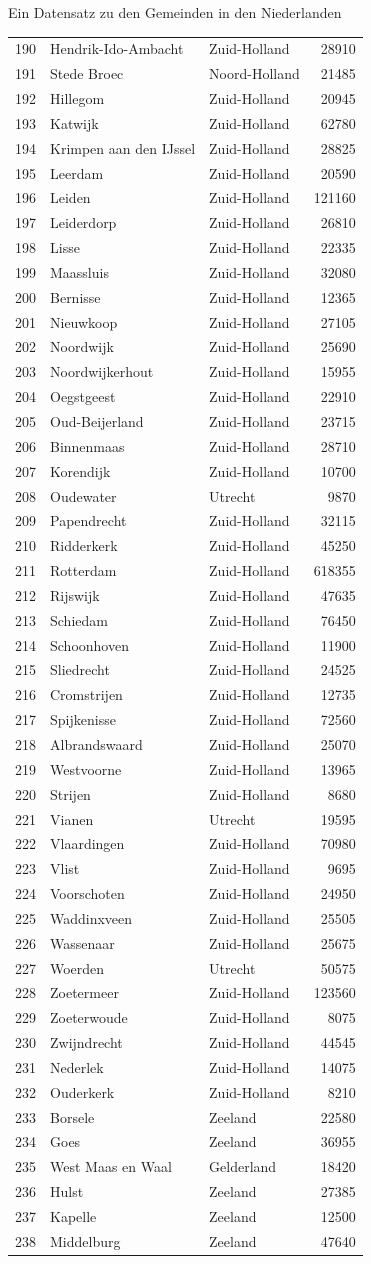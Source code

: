 \documentclass[ignorenonframetext,]{beamer}
\begin{document}
\begin{frame}[fragile]{Ein Datensatz zu den Gemeinden in den
Niederlanden}
\begin{longtable}[]{@{}lllr@{}}
190 & Hendrik-Ido-Ambacht & Zuid-Holland & 28910\tabularnewline
191 & Stede Broec & Noord-Holland & 21485\tabularnewline
192 & Hillegom & Zuid-Holland & 20945\tabularnewline
193 & Katwijk & Zuid-Holland & 62780\tabularnewline
194 & Krimpen aan den IJssel & Zuid-Holland & 28825\tabularnewline
195 & Leerdam & Zuid-Holland & 20590\tabularnewline
196 & Leiden & Zuid-Holland & 121160\tabularnewline
197 & Leiderdorp & Zuid-Holland & 26810\tabularnewline
198 & Lisse & Zuid-Holland & 22335\tabularnewline
199 & Maassluis & Zuid-Holland & 32080\tabularnewline
200 & Bernisse & Zuid-Holland & 12365\tabularnewline
201 & Nieuwkoop & Zuid-Holland & 27105\tabularnewline
202 & Noordwijk & Zuid-Holland & 25690\tabularnewline
203 & Noordwijkerhout & Zuid-Holland & 15955\tabularnewline
204 & Oegstgeest & Zuid-Holland & 22910\tabularnewline
205 & Oud-Beijerland & Zuid-Holland & 23715\tabularnewline
206 & Binnenmaas & Zuid-Holland & 28710\tabularnewline
207 & Korendijk & Zuid-Holland & 10700\tabularnewline
208 & Oudewater & Utrecht & 9870\tabularnewline
209 & Papendrecht & Zuid-Holland & 32115\tabularnewline
210 & Ridderkerk & Zuid-Holland & 45250\tabularnewline
211 & Rotterdam & Zuid-Holland & 618355\tabularnewline
212 & Rijswijk & Zuid-Holland & 47635\tabularnewline
213 & Schiedam & Zuid-Holland & 76450\tabularnewline
214 & Schoonhoven & Zuid-Holland & 11900\tabularnewline
215 & Sliedrecht & Zuid-Holland & 24525\tabularnewline
216 & Cromstrijen & Zuid-Holland & 12735\tabularnewline
217 & Spijkenisse & Zuid-Holland & 72560\tabularnewline
218 & Albrandswaard & Zuid-Holland & 25070\tabularnewline
219 & Westvoorne & Zuid-Holland & 13965\tabularnewline
220 & Strijen & Zuid-Holland & 8680\tabularnewline
221 & Vianen & Utrecht & 19595\tabularnewline
222 & Vlaardingen & Zuid-Holland & 70980\tabularnewline
223 & Vlist & Zuid-Holland & 9695\tabularnewline
224 & Voorschoten & Zuid-Holland & 24950\tabularnewline
225 & Waddinxveen & Zuid-Holland & 25505\tabularnewline
226 & Wassenaar & Zuid-Holland & 25675\tabularnewline
227 & Woerden & Utrecht & 50575\tabularnewline
228 & Zoetermeer & Zuid-Holland & 123560\tabularnewline
229 & Zoeterwoude & Zuid-Holland & 8075\tabularnewline
230 & Zwijndrecht & Zuid-Holland & 44545\tabularnewline
231 & Nederlek & Zuid-Holland & 14075\tabularnewline
232 & Ouderkerk & Zuid-Holland & 8210\tabularnewline
233 & Borsele & Zeeland & 22580\tabularnewline
234 & Goes & Zeeland & 36955\tabularnewline
235 & West Maas en Waal & Gelderland & 18420\tabularnewline
236 & Hulst & Zeeland & 27385\tabularnewline
237 & Kapelle & Zeeland & 12500\tabularnewline
238 & Middelburg & Zeeland & 47640\tabularnewline

\end{longtable}
\end{frame}
\end{document}
